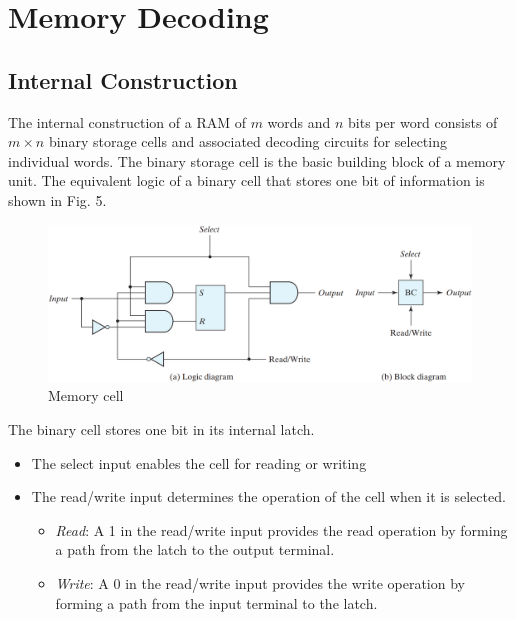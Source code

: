 \section{Memory Decoding}
\label{sec:memory-decoding}

\subsection{Internal Construction}
\label{subsec:internal-construction}

The internal construction of a RAM of $m$ words and $n$ bits per word consists of $m \times n$ binary storage cells and associated decoding circuits for selecting individual words. The binary storage cell is the basic building block of a memory unit. The equivalent logic of a binary cell that stores one bit of information is shown in Fig. 5.
\begin{figure}[H]
  \centering
  \includegraphics[width=\linewidth]{img/fig-7.5.png}
  \caption{Memory cell}
  \label{fig:7.5}
\end{figure}

\noindent The binary cell stores one bit in its internal latch.
\begin{itemize}[leftmargin=0.6cm]
  \item The select input enables the cell for reading or writing
  \item The read/write input determines the operation of the cell when it is selected.
    \begin{itemize}[leftmargin=0.6cm]
      \item \textit{Read}: A 1 in the read/write input provides the read operation by forming a path from the latch to the output terminal.
      \item \textit{Write}: A 0 in the read/write input provides the write operation by forming a path from the input terminal to the latch.
    \end{itemize}
\end{itemize}

\vspace*{\fill}
\columnbreak

